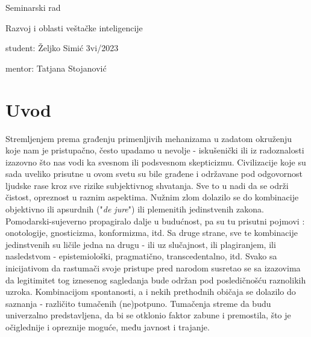 \documentclass[fontsize=11bp, paper=a4]{scrartcl}
\begin{document}
\ohead[]{}

\begin{center}
    {\Large Seminarski rad}

    \normalsize{Razvoj i oblasti veštačke inteligencije}
\end{center}

\hfill student: Željko Simić 3vi/2023

\hfill mentor: Tatjana Stojanović

\linespread{0.8}

\section{\normalsize{Uvod}}
Stremljenjem prema građenju  primenljivih mehanizama u zadatom okruženju koje nam je pristupačno, često upadamo u nevolje\cite{failbilism} - iskušenički ili iz radoznalosti izazovno što nas vodi ka svesnom ili podsvesnom skepticizmu.
Civilizacije\cite{humancpu} koje su sada uveliko prisutne u ovom svetu su bile građene i održavane pod odgovornost ljudske rase kroz sve rizike subjektivnog shvatanja. 
Sve to u nadi da se održi čistost, opreznost u raznim aspektima. 
Nužnim zlom dolazilo se do kombinacije objektivno ili apsurdnih ("\textit{de jure}")\cite{kuhn_vs_popper} ili plemenitih jedinstvenih zakona\cite{dostojevski}. 
Pomodarski-sujeverno propagiralo dalje u budućnost, pa su tu prisutni pojmovi : onotologije, gnosticizma, konformizma, itd. 
Sa druge strane, sve te kombinacije jedinstvenih su ličile jedna na drugu - ili uz slučajnost, ili plagiranjem, ili nasledstvom - epistemiološki, pragmatično, transcedentalno, itd.
 Svako sa inicijativom da rastumači svoje pristupe pred narodom susretao se sa izazovima da legitimitet tog iznesenog sagledanja bude održan pod posledičnošću raznolikih uzroka.
Kombinacijom spontanosti, a i nekih prethodnih običaja se dolazilo do saznanja - različito tumačenih (ne)potpuno. Tumačenja streme da budu univerzalno predstavljena, da bi se otklonio faktor zabune i premostila, što je očiglednije i opreznije moguće, među javnost i trajanje. 
\end{document}
